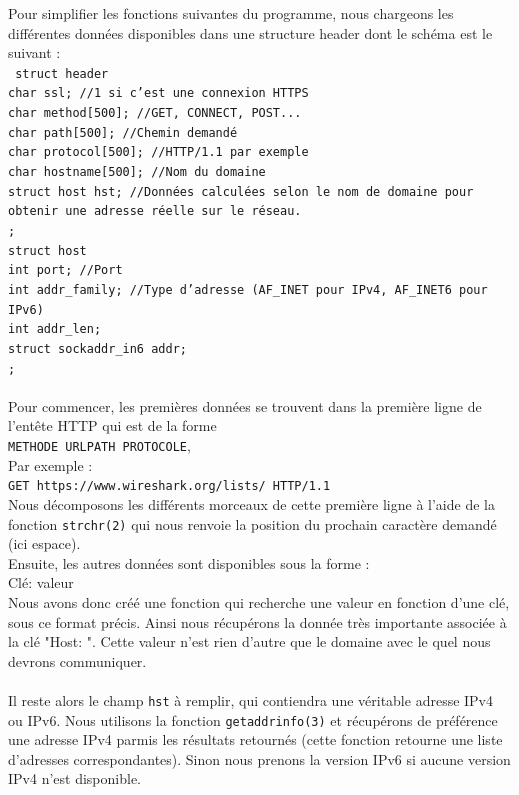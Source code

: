 \documentclass{scrreprt}
\def\code#1{\texttt{#1}}
\let\tab\quad
\begin{document}
Pour simplifier les fonctions suivantes du programme, nous chargeons les différentes données disponibles dans une structure header dont le schéma est le suivant :\\
\code{
  struct header {\\
  \tab  char ssl; //1 si c'est une connexion HTTPS\\
  \tab  char method[500]; //GET, CONNECT, POST...\\
  \tab  char path[500]; //Chemin demandé\\
  \tab  char protocol[500]; //HTTP/1.1 par exemple\\
  \tab  char hostname[500]; //Nom du domaine\\
  \tab  struct host hst; //Données calculées selon le nom de domaine pour obtenir une adresse réelle sur le réseau.\\
  };\\
  struct host {\\
  \tab  int port; //Port\\
  \tab  int addr_family; //Type d'adresse (AF_INET pour IPv4, AF_INET6 pour IPv6)\\
  \tab  int addr_len;\\
  \tab  struct sockaddr_in6 addr;\\
  };\\
}
\\
Pour commencer, les premières données se trouvent dans la première ligne de l'entête HTTP qui est de la forme\\
\code{METHODE URLPATH PROTOCOLE},\\
Par exemple :\\
\code{GET https://www.wireshark.org/lists/ HTTP/1.1}\\
Nous décomposons les différents morceaux de cette première ligne à l'aide de la fonction \code{strchr(2)} qui nous renvoie la position du prochain caractère demandé (ici espace).\\
Ensuite, les autres données sont disponibles sous la forme :\\
Clé: valeur\\
Nous avons donc créé une fonction qui recherche une valeur en fonction d'une clé, sous ce format précis. Ainsi nous récupérons la donnée très importante associée à la clé "Host: ". Cette valeur n'est rien d'autre que le domaine avec le quel nous devrons communiquer.\\
\\
Il reste alors le champ \code{hst} à remplir, qui contiendra une véritable adresse IPv4 ou IPv6. Nous utilisons la fonction \code{getaddrinfo(3)} et récupérons de préférence une adresse IPv4 parmis les résultats retournés (cette fonction retourne une liste d'adresses correspondantes). Sinon nous prenons la version IPv6 si aucune version IPv4 n'est disponible.
\end{document}
